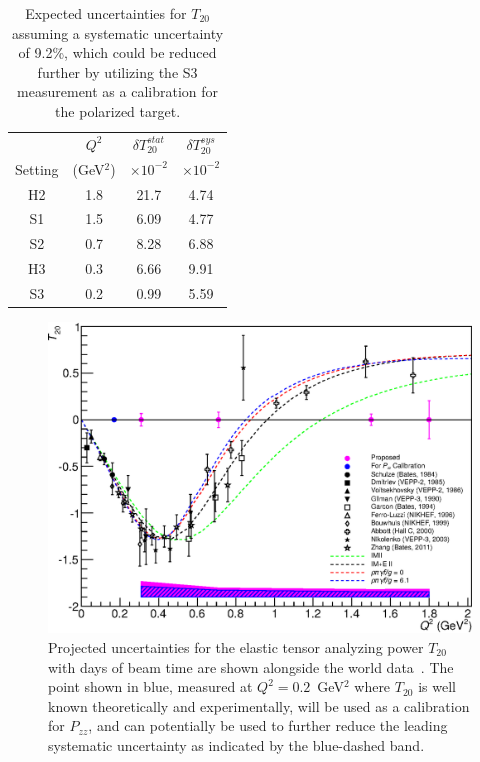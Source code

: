 \begin{table}
\begin{center}
\begin{tabular}{c|c|c|c}
		& $Q^2$    	& $\delta T_{20}^{stat}$	&  $\delta T_{20}^{sys}$ \\
Setting	& (GeV$^2$)	& $\times 10^{-2}$		& $\times 10^{-2}$ \\
\hline\hline
H2 		& 1.8		&  21.7					& 4.74 \\  
S1 		& 1.5		&  6.09					& 4.77 \\
S2 		& 0.7		&  8.28					& 6.88 \\  
H3 		& 0.3		&  6.66					& 9.91 \\  
S3 		& 0.2		&  0.99					& 5.59 \\
  
\hline\hline
\end{tabular}
\caption{\label{RATES-T20}Expected uncertainties for $T_{20}$ assuming a systematic uncertainty of 9.2\%, which could be reduced further by utilizing the S3 measurement as a calibration for the polarized target.}
\end{center}
\end{table}

\begin{figure}
\begin{center}
\includegraphics[width=\textwidth]{figs/plot_t20_fit.eps} 
\caption{\label{PROJ-T20}Projected uncertainties for the elastic tensor analyzing power $T_{20}$ with \productiondays days of beam time are shown alongside the world data~\cite{Holt:2012gg}. The point shown in blue, measured at $Q^2=0.2$~GeV$^2$ where $T_{20}$ is well known theoretically and experimentally, will be used as a calibration for $P_{zz}$, and can potentially be used to further reduce the leading systematic uncertainty as indicated by the blue-dashed band.
}
\end{center}
\end{figure}

